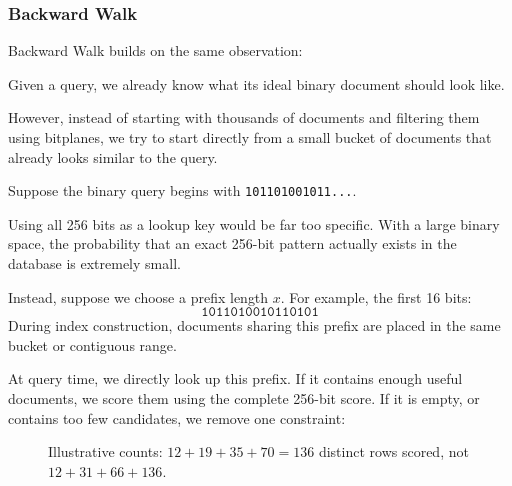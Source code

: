 \subsubsection{Backward Walk}
Backward Walk builds on the same observation:

Given a query, we already know what its ideal binary document should look like.

However, instead of starting with thousands of documents and filtering them using bitplanes,
we try to start directly from a small bucket of documents that already looks similar to the query.

Suppose the binary query begins with \texttt{101101001011...}.

Using all 256 bits as a lookup key would be far too specific. With a large binary space,
the probability that an exact 256-bit pattern actually exists in the database is extremely small.

Instead, suppose we choose a prefix length $x$. For example, the first 16 bits:
\[
\texttt{1011010010110101}
\]
During index construction, documents sharing this prefix are placed in the same bucket or
contiguous range.

At query time, we directly look up this prefix. If it contains enough useful documents, we
score them using the complete 256-bit score. If it is empty, or contains too few candidates,
we remove one constraint:

\begin{figure}[H]\centering
{}
\caption{Illustrative counts: $12+19+35+70=136$ distinct rows scored, not $12+31+66+136$.}
\end{figure}

